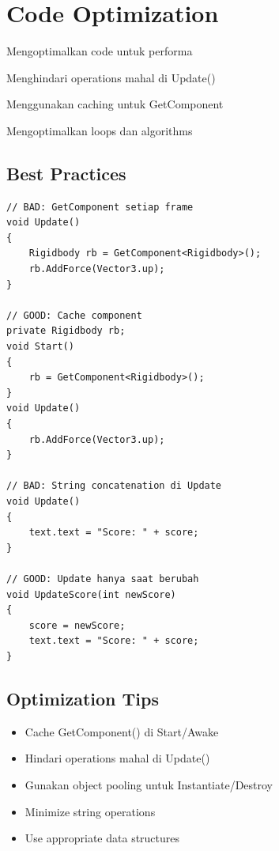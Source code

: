 
\section{Code Optimization}

\begin{learningoutcomes}
\item Mengoptimalkan code untuk performa
\item Menghindari operations mahal di Update()
\item Menggunakan caching untuk GetComponent
\item Mengoptimalkan loops dan algorithms
\end{learningoutcomes}

\subsection{Best Practices}

\begin{lstlisting}[language={[Sharp]C}]
// BAD: GetComponent setiap frame
void Update()
{
    Rigidbody rb = GetComponent<Rigidbody>();
    rb.AddForce(Vector3.up);
}

// GOOD: Cache component
private Rigidbody rb;
void Start()
{
    rb = GetComponent<Rigidbody>();
}
void Update()
{
    rb.AddForce(Vector3.up);
}

// BAD: String concatenation di Update
void Update()
{
    text.text = "Score: " + score;
}

// GOOD: Update hanya saat berubah
void UpdateScore(int newScore)
{
    score = newScore;
    text.text = "Score: " + score;
}
\end{lstlisting}

\subsection{Optimization Tips}

\begin{itemize}
\item Cache GetComponent() di Start/Awake
\item Hindari operations mahal di Update()
\item Gunakan object pooling untuk Instantiate/Destroy
\item Minimize string operations
\item Use appropriate data structures
\end{itemize}

